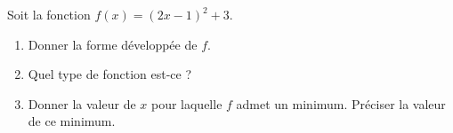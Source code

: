 
\begin{exercice}\label{exosmath-0270}

    Soit la fonction \( f(x)=(2x-1)^2+3\).
    \begin{enumerate}
        \item
            Donner la forme développée de \( f\).
        \item
            Quel type de fonction est-ce ?
        \item
            Donner la valeur de \( x\) pour laquelle \( f\) admet un minimum. Préciser la valeur de ce minimum.
    \end{enumerate}

\end{exercice}

